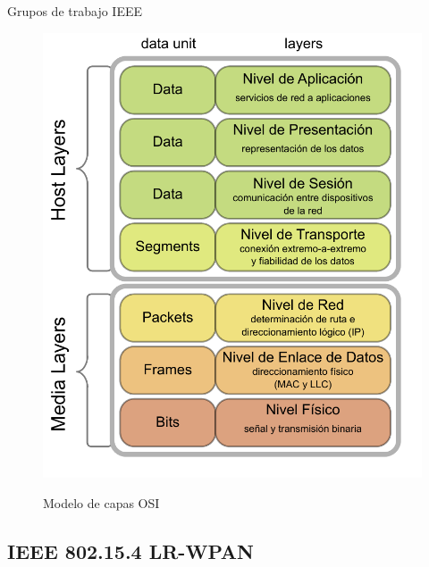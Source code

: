 \documentclass[aspectratio=169]{beamer}
\begin{document}
\begin{frame}{Grupos de trabajo IEEE}
\begin{minipage}[c]{1.0\linewidth}
\begin{minipage}[c]{0.35\linewidth}
\begin{figure}[H]
			\includegraphics[width=1\textwidth]{./imagenes/OSI_Model_v1.pdf}
			\label{OSI_model}
			\caption{Modelo de capas OSI}
		\end{figure}	  	  	
	\end{minipage}
\end{minipage}
	
\end{frame}

\subsection[IEEE 802.15.4]{IEEE 802.15.4 LR-WPAN}
\end{document}
